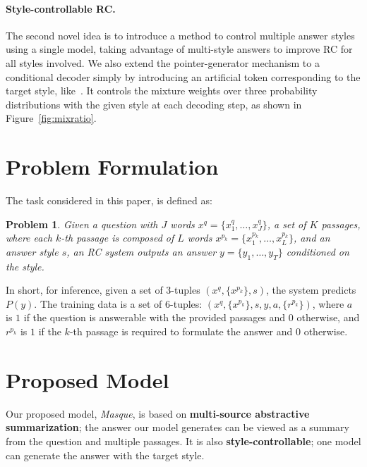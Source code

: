 \documentclass[11pt,a4paper]{article}
\theoremstyle{mydef}
\theoremstyle{myprob}
\newtheorem{problem}{Problem}
\begin{document}
\paragraph{Style-controllable RC.} The second novel idea is to introduce a method to control multiple answer styles using a single model, taking advantage of multi-style answers to improve RC for all styles involved. We also extend the pointer-generator mechanism to a conditional decoder simply by introducing an artificial token corresponding to the target style, like~\citep{JohnsonSLKWCTVW17,TakenoNY17}. It controls the mixture weights over three probability distributions with the given style at each decoding step, as shown in Figure~\ref{fig:mixratio}.

\section{Problem Formulation}
\label{sec:problem}

The task considered in this paper, is defined as:
\begin{problem}
\label{prob:prob}
Given a question with $J$ words $x^q = \{x^q_1, \ldots, x^q_J\}$, a set of $K$ passages, where each $k$-th passage is composed of $L$ words $x^{p_k} = \{x^{p_k}_1, \ldots, x^{p_k}_{L}\}$, and an answer style $s$, an RC system %
outputs an answer $y = \{y_1, \ldots, y_T \}$ conditioned on the style.
\end{problem}
In short, for inference, given a set of 3-tuples $(x^q, \{x^{p_k}\}, s)$, the system predicts $P(y)$.
The training data is a set of 6-tuples: $(x^q, \{x^{p_k}\}, s, y, a, \{r^{p_k}\})$, where 
$a$ is $1$ if the question is answerable with the provided passages and $0$ otherwise, and 
$r^{p_k}$ is $1$ if the $k$-th passage is required to formulate the answer and $0$ otherwise.

\section{Proposed Model} 

Our proposed model, \textit{Masque}, is based on \textbf{multi-source abstractive summarization}; the answer our model generates can be viewed as a summary from the question and multiple passages. It is also \textbf{style-controllable}; one model can generate the answer with the target style.
\end{document}
